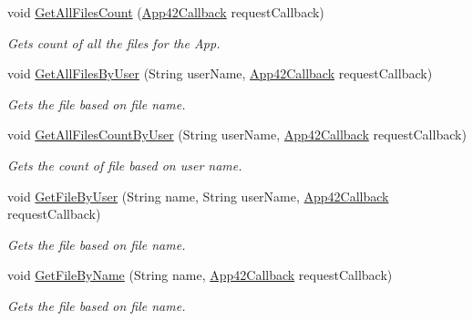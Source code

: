 \begin{DoxyCompactItemize}
void \hyperlink{classcom_1_1shephertz_1_1app42_1_1paas_1_1sdk_1_1windows_1_1upload_1_1_upload_service_a45bb284253e2bb6c57b8f2a770fb2997}{Get\+All\+Files\+Count} (\hyperlink{interfacecom_1_1shephertz_1_1app42_1_1paas_1_1sdk_1_1windows_1_1_app42_callback}{App42\+Callback} request\+Callback)
\begin{DoxyCompactList}\small\item\em Gets count of all the files for the App. \end{DoxyCompactList}\item 
void \hyperlink{classcom_1_1shephertz_1_1app42_1_1paas_1_1sdk_1_1windows_1_1upload_1_1_upload_service_ad4a3375ee379d36cf5c8312324b30f05}{Get\+All\+Files\+By\+User} (String user\+Name, \hyperlink{interfacecom_1_1shephertz_1_1app42_1_1paas_1_1sdk_1_1windows_1_1_app42_callback}{App42\+Callback} request\+Callback)
\begin{DoxyCompactList}\small\item\em Gets the file based on file name. \end{DoxyCompactList}\item 
void \hyperlink{classcom_1_1shephertz_1_1app42_1_1paas_1_1sdk_1_1windows_1_1upload_1_1_upload_service_ae8dd1df688f6228f0932e8bc724076ca}{Get\+All\+Files\+Count\+By\+User} (String user\+Name, \hyperlink{interfacecom_1_1shephertz_1_1app42_1_1paas_1_1sdk_1_1windows_1_1_app42_callback}{App42\+Callback} request\+Callback)
\begin{DoxyCompactList}\small\item\em Gets the count of file based on user name. \end{DoxyCompactList}\item 
void \hyperlink{classcom_1_1shephertz_1_1app42_1_1paas_1_1sdk_1_1windows_1_1upload_1_1_upload_service_a6002b2343628cba6407675cd56c7caf5}{Get\+File\+By\+User} (String name, String user\+Name, \hyperlink{interfacecom_1_1shephertz_1_1app42_1_1paas_1_1sdk_1_1windows_1_1_app42_callback}{App42\+Callback} request\+Callback)
\begin{DoxyCompactList}\small\item\em Gets the file based on file name. \end{DoxyCompactList}\item 
void \hyperlink{classcom_1_1shephertz_1_1app42_1_1paas_1_1sdk_1_1windows_1_1upload_1_1_upload_service_aef16784266fac5807322f3d35684ad20}{Get\+File\+By\+Name} (String name, \hyperlink{interfacecom_1_1shephertz_1_1app42_1_1paas_1_1sdk_1_1windows_1_1_app42_callback}{App42\+Callback} request\+Callback)
\begin{DoxyCompactList}\small\item\em Gets the file based on file name. \end{DoxyCompactList}\item 

\end{DoxyCompactItemize}
